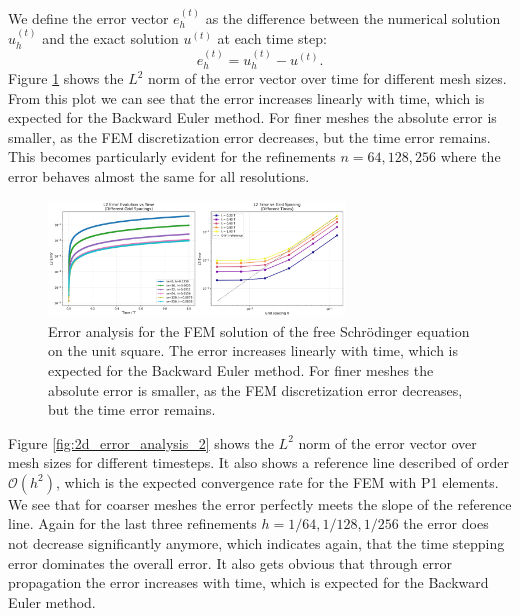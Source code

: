 \documentclass{article}
\theoremstyle{definition}
\theoremstyle{plain}
\theoremstyle{remark}
\begin{document}
We define the error vector $e_h^{(t)}$ as the difference between the numerical solution $u_h^{(t)}$ and the exact solution $u^{(t)}$ at each time step:
\[
e_h^{(t)} = u_h^{(t)} - u^{(t)}.
\]
Figure \ref{fig:2d_error_analysis} shows the $L^2$ norm of the error vector over time for different mesh sizes.
From this plot we can see that the error increases linearly with time, which is expected for the Backward Euler method.
For finer meshes the absolute error is smaller, as the FEM discretization error decreases, but the time error remains. 
This becomes particularly evident for the refinements $n=64, 128, 256$ where the error behaves almost the same for all resolutions.

\begin{figure}[h!]
  \centering
  \includegraphics[width=0.7\textwidth, trim=0cm 0cm 18.1cm 0cm, clip]{figures/2d_error_analysis.png}
  \caption{Error analysis for the FEM solution of the free Schrödinger equation on the unit square. The error increases linearly with time, which is expected for the Backward Euler method. For finer meshes the absolute error is smaller, as the FEM discretization error decreases, but the time error remains.}
  \label{fig:2d_error_analysis}
\end{figure}


Figure \ref{fig:2d_error_analysis_2} shows the $L^2$ norm of the error vector over mesh sizes for different timesteps.
It also shows a reference line described of order  $\mathcal{O}(h^2)$, which is the expected convergence rate for the FEM with P1 elements.
We see that for coarser meshes the error perfectly meets the slope of the reference line.
Again for the last three refinements $h=1/64, 1/128, 1/256$ the error does not decrease significantly anymore, which indicates again, that the time stepping error dominates the overall error.
It also gets obvious that through error propagation the error increases with time, which is expected for the Backward Euler method.
\end{document}
